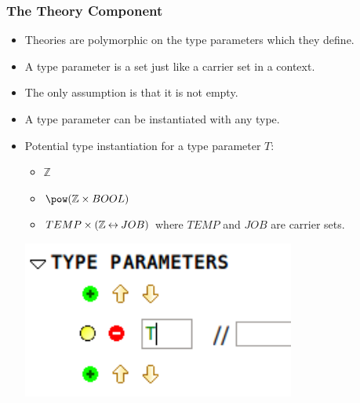 \documentclass{beamer}
\begin{document}
	\begin{frame}
		\frametitle{The Theory Component}
		\begin{itemize}
			\item Theories are polymorphic on the type parameters which they define.
			\item A type parameter is a set just like a carrier set in a context.
			\item The only assumption is that it is not empty.
			\item A type parameter can be instantiated with any type.
			\item Potential type instantiation for a type parameter $T$:
				\begin{itemize}
					\item $\mathbb{Z}$
					\item $\pow(\mathbb{Z} \cprod BOOL)$
					\item $TEMP \mathbin\times (\mathbb{Z} \mathbin\leftrightarrow JOB)$ where $TEMP$ and $JOB$ are carrier sets.
				\end{itemize}
				\begin{center}
					\includegraphics[scale=0.5]{TypeParameter}
				\end{center}
		\end{itemize}
	\end{frame}
\end{document}
